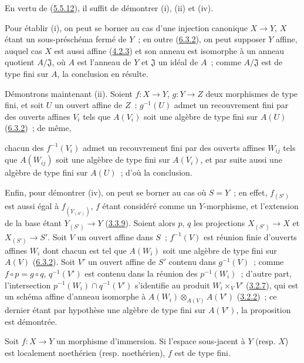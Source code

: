 En vertu de (\hyperref[I.5.5.12-fr]{5.5.12}), il suffit de démontrer (i),
(ii) et (iv).

Pour établir (i), on peut se borner au cas d'une injection canonique
$X\to Y$, $X$ étant un sous-préschéma fermé de $Y$~; en outre
(\hyperref[I.6.3.2-fr]{6.3.2}), on peut supposer $Y$ affine, auquel cas $X$
est aussi affine (\hyperref[I.4.2.3-fr]{4.2.3}) et son anneau est isomorphe à
un anneau quotient $A/\mathfrak{J}$, où $A$ est l'anneau de $Y$ et
$\mathfrak{J}$ un idéal de $A$~; comme $A/\mathfrak{J}$ est de type fini sur
$A$, la conclusion en résulte.

Démontrons maintenant (ii). Soient $f:X\to Y$, $g:Y\to Z$ deux morphismes de
type fini, et soit $U$ un ouvert affine de $Z$~; $g^{-1}(U)$ admet un
recouvrement fini par des ouverts affines $V_i$ tels que $A(V_i)$ soit une
algèbre de type fini sur $A(U)$ (\hyperref[I.6.3.2-fr]{6.3.2})~; de même,

chacun des $f^{-1}(V_i)$ admet un recouvrement fini par des ouverts affines
$W_{ij}$ tels que $A(W_{ij})$ soit une algèbre de type fini sur $A(V_i)$, et
par suite aussi une algèbre de type fini sur $A(U)$~; d'où la conclusion.

Enfin, pour démontrer (iv), on peut se borner au cas où $S=Y$~; en effet,
$f_{(S')}$ est aussi égal à $f_{(Y_{(S')})}$, $f$ étant considéré comme un
$Y$-morphisme, et l'extension de la base étant $Y_{(S')}\to Y$
(\hyperref[I.3.3.9-fr]{3.3.9}). Soient alors $p$, $q$ les projections
$X_{(S')}\to X$ et $X_{(S')}\to S'$. Soit $V$ un ouvert affine dans $S$~;
$f^{-1}(V)$ est réunion finie d'ouverts affines $W_i$ dont chacun est tel que
$A(W_i)$ soit une algèbre de type fini sur $A(V)$
(\hyperref[I.6.3.2-fr]{6.3.2}). Soit $V'$ un ouvert affine de $S'$ contenu
dans $g^{-1}(V)$~; comme $f\circ p=g\circ q$, $q^{-1}(V')$ est contenu dans la
réunion des $p^{-1}(W_i)$~; d'autre part, l'intersection
$p^{-1}(W_i)\cap q^{-1}(V')$ s'identifie au produit $W_i\times_V V'$
(\hyperref[I.3.2.7-fr]{3.2.7}), qui est un schéma affine d'anneau isomorphe à
$A(W_i)\otimes_{A(V)}A(V')$ (\hyperref[I.3.2.2-fr]{3.2.2})~; ce dernier étant
par hypothèse une algèbre de type fini sur $A(V')$, la proposition est
démontrée.

\begin{corollary}[6.3.5]
\label{I.6.3.5-fr}
Soit $f:X\to Y$ un morphisme d'immersion. Si l'espace sous-jacent à $Y$
(resp. $X$) est localement noethérien (resp. noethérien), $f$ est de type fini.
\end{corollary}

